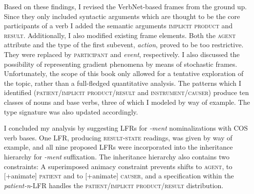 Based on these findings, I revised the VerbNet-based frames from the ground up. 
Since they only included syntactic arguments  \textendash{}  which are thought to be the core participants of a verb  \textendash{}  I added the semantic arguments \textsc{implicit product} and \textsc{result}. 
Additionally, I also modified existing frame elements. 
Both the \textsc{agent} attribute and the type of the first subevent, \textit{action}, proved to be too restrictive. They were replaced by \textsc{participant} and \textit{event}, respectively.
I also discussed the possibility of representing gradient phenomena by means of stochastic frames. Unfortunately, the scope of this book only allowed for a tentative exploration of the topic, rather than a full-fledged quantitative analysis.
The patterns which I identified (\textsc{patient/implicit product/result} and \textsc{instrument/causer}) produce ten classes of nouns and base verbs, three of which I modeled by way of example. The type signature was also updated accordingly.

I concluded my analysis by suggesting LFRs for \textit{-ment} nominalizations with COS verb bases. One LFR, producing \textsc{result-state} readings, was given by way of example, and all nine proposed LFRs were incorporated into the inheritance hierarchy for \textit{-ment} suffixation. 
The inheritance hierarchy also contains two constraints: A superimposed animacy constraint prevents shifts to \textsc{agent}, to [+animate] \textsc{patient} and to [+animate] \textsc{causer}, and a specification within the \textit{patient-n}-LFR handles the \textsc{patient/implicit product/result} distribution. 
